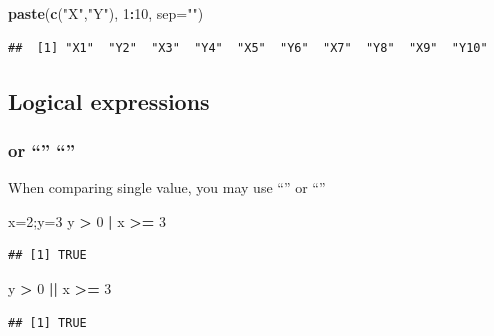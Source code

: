 \documentclass[]{article}
\newenvironment{Shaded}{\begin{snugshade}}{\end{snugshade}}
\newcommand{\DataTypeTok}[1]{\textcolor[rgb]{0.13,0.29,0.53}{#1}}
\newcommand{\DecValTok}[1]{\textcolor[rgb]{0.00,0.00,0.81}{#1}}
\newcommand{\KeywordTok}[1]{\textcolor[rgb]{0.13,0.29,0.53}{\textbf{#1}}}
\newcommand{\NormalTok}[1]{#1}
\newcommand{\OperatorTok}[1]{\textcolor[rgb]{0.81,0.36,0.00}{\textbf{#1}}}
\newcommand{\StringTok}[1]{\textcolor[rgb]{0.31,0.60,0.02}{#1}}
\begin{document}
\begin{Shaded}
\begin{Highlighting}[]
\KeywordTok{paste}\NormalTok{(}\KeywordTok{c}\NormalTok{(}\StringTok{"X"}\NormalTok{,}\StringTok{"Y"}\NormalTok{), }\DecValTok{1}\OperatorTok{:}\DecValTok{10}\NormalTok{, }\DataTypeTok{sep=}\StringTok{""}\NormalTok{)}
\end{Highlighting}
\end{Shaded}

\begin{verbatim}
##  [1] "X1"  "Y2"  "X3"  "Y4"  "X5"  "Y6"  "X7"  "Y8"  "X9"  "Y10"
\end{verbatim}

\hypertarget{logical-expressions}{%
\subsection{Logical expressions}\label{logical-expressions}}

\hypertarget{or-1}{%
\subsubsection{or ``\textbar{}'' ``\textbar{}\textbar{}''}\label{or-1}}

When comparing single value, you may use ``\textbar{}'' or
``\textbar{}\textbar{}''

\begin{Shaded}
\begin{Highlighting}[]
\NormalTok{x=}\DecValTok{2}\NormalTok{;y=}\DecValTok{3}
\NormalTok{y }\OperatorTok{>}\StringTok{ }\DecValTok{0} \OperatorTok{|}\StringTok{ }\NormalTok{x }\OperatorTok{>=}\StringTok{ }\DecValTok{3}
\end{Highlighting}
\end{Shaded}

\begin{verbatim}
## [1] TRUE
\end{verbatim}

\begin{Shaded}
\begin{Highlighting}[]
\NormalTok{y }\OperatorTok{>}\StringTok{ }\DecValTok{0} \OperatorTok{||}\StringTok{ }\NormalTok{x }\OperatorTok{>=}\StringTok{ }\DecValTok{3}
\end{Highlighting}
\end{Shaded}

\begin{verbatim}
## [1] TRUE
\end{verbatim}
\end{document}
